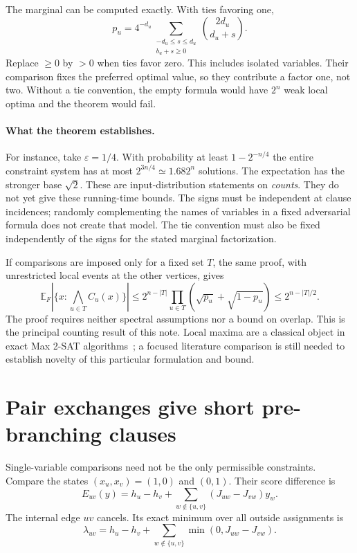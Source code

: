 \documentclass[11pt,a4paper]{article}
\theoremstyle{remark}
\newcommand{\E}{\mathbb E}
\begin{document}
The marginal can be computed exactly. With ties favoring one,
\[
 p_u=4^{-d_u}\sum_{\substack{-d_u\le s\le d_u\\b_u+s\ge0}}
                  \binom{2d_u}{d_u+s}.
\]
Replace $\ge0$ by $>0$ when ties favor zero. This includes isolated
variables. Their comparison fixes the preferred optimal value, so they
contribute a factor one, not two. Without a tie convention, the empty
formula would have $2^n$ weak local optima and the theorem would fail.

\paragraph{What the theorem establishes.}
For instance, take $\varepsilon=1/4$. With probability at least
$1-2^{-n/4}$ the entire constraint system has at most
$2^{3n/4}\simeq1.682^n$ solutions. The expectation has the stronger
base $\sqrt2$. These are input-distribution statements on \emph{counts}.
They do not yet give these running-time bounds. The signs must be
independent at clause incidences; randomly complementing the names of
variables in a fixed adversarial formula does not create that model.
The tie convention must also be fixed independently of the signs for
the stated marginal factorization.

If comparisons are imposed only for a fixed set $T$, the same proof,
with unrestricted local events at the other vertices, gives
\[
 \E_F\left|\{x:\bigwedge_{u\in T}C_u(x)\}\right|
 \le 2^{n-|T|}\prod_{u\in T}(\sqrt{p_u}+\sqrt{1-p_u})
 \le 2^{n-|T|/2}.
\]
The proof requires neither spectral assumptions nor a bound on overlap.
This is the principal counting result of this note. Local maxima are a
classical object in exact Max 2-SAT algorithms~\cite{Hastings}; a focused
literature comparison is still needed to establish novelty of this
particular formulation and bound.

\section{Pair exchanges give short pre-branching clauses}
\label{sec:exchange}

Single-variable comparisons need not be the only permissible constraints.
Compare the states $(x_u,x_v)=(1,0)$ and $(0,1)$. Their score difference is
\begin{equation}
 E_{uv}(y)=h_u-h_v+
       \sum_{w\notin\{u,v\}}(J_{uw}-J_{vw})y_w. \label{eq:exchange}
\end{equation}
The internal edge $uv$ cancels. Its exact minimum over all outside
assignments is
\begin{equation}
 \lambda_{uv}=h_u-h_v+
       \sum_{w\notin\{u,v\}}\min(0,J_{uw}-J_{vw}).
                                                        \label{eq:exmin}
\end{equation}
\end{document}
